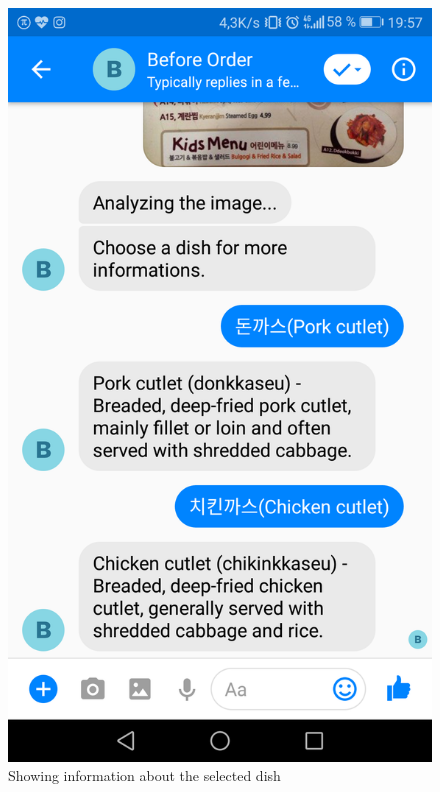 \begin{figure}[htbp]
\centerline{\includegraphics[height=\custompicheight]{./pictures/Screenshot_20181125-195753}}
\caption{Showing information about the selected dish}
\label{fig:Before Order_show_dish information}
\end{figure}
\FloatBarrier
